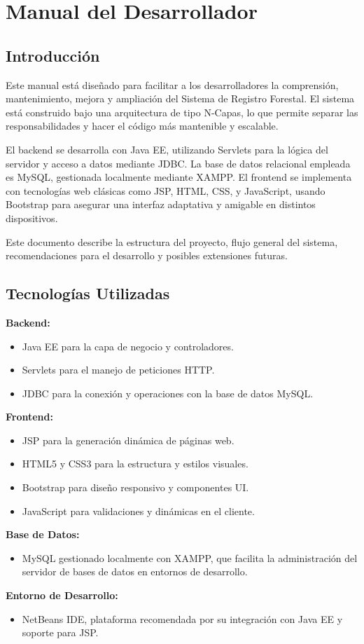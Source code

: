 \chapter{Manual del Desarrollador}
\label{cap:manual}

\section{Introducción}
Este manual está diseñado para facilitar a los desarrolladores la comprensión, mantenimiento, mejora y ampliación del Sistema de Registro Forestal. El sistema está construido bajo una arquitectura de tipo N-Capas, lo que permite separar las responsabilidades y hacer el código más mantenible y escalable.

El backend se desarrolla con Java EE, utilizando Servlets para la lógica del servidor y acceso a datos mediante JDBC. La base de datos relacional empleada es MySQL, gestionada localmente mediante XAMPP. El frontend se implementa con tecnologías web clásicas como JSP, HTML, CSS, y JavaScript, usando Bootstrap para asegurar una interfaz adaptativa y amigable en distintos dispositivos.

Este documento describe la estructura del proyecto, flujo general del sistema, recomendaciones para el desarrollo y posibles extensiones futuras.

\section{Tecnologías Utilizadas}
\textbf{Backend:}
\begin{itemize}
    \item Java EE para la capa de negocio y controladores.
    \item Servlets para el manejo de peticiones HTTP.
    \item JDBC para la conexión y operaciones con la base de datos MySQL.
\end{itemize}
\textbf{Frontend:}
\begin{itemize}
    \item JSP para la generación dinámica de páginas web.
    \item HTML5 y CSS3 para la estructura y estilos visuales.
    \item Bootstrap para diseño responsivo y componentes UI.
    \item JavaScript para validaciones y dinámicas en el cliente.
\end{itemize}
\textbf{Base de Datos:}
\begin{itemize}
    \item MySQL gestionado localmente con XAMPP, que facilita la administración del servidor de bases de datos en entornos de desarrollo.
\end{itemize}
\textbf{Entorno de Desarrollo:}
\begin{itemize}
    \item NetBeans IDE, plataforma recomendada por su integración con Java EE y soporte para JSP.
\end{itemize}

